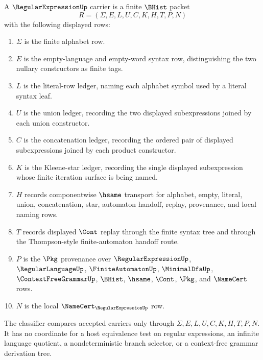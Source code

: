 \begin{definition}
\label{def:regular-expression-carrier}
A $\RegularExpressionUp$ carrier is a finite $\BHist$ packet
$$
R=(\Sigma,E,L,U,C,K,H,T,P,N)
$$
with the following displayed rows:
\begin{enumerate}
\item $\Sigma$ is the finite alphabet row.
\item $E$ is the empty-language and empty-word syntax row, distinguishing the two nullary constructors as finite tags.
\item $L$ is the literal-row ledger, naming each alphabet symbol used by a literal syntax leaf.
\item $U$ is the union ledger, recording the two displayed subexpressions joined by each union constructor.
\item $C$ is the concatenation ledger, recording the ordered pair of displayed subexpressions joined by each product constructor.
\item $K$ is the Kleene-star ledger, recording the single displayed subexpression whose finite iteration surface is being named.
\item $H$ records componentwise $\hsame$ transport for alphabet, empty, literal, union, concatenation, star, automaton handoff, replay, provenance, and local naming rows.
\item $T$ records displayed $\Cont$ replay through the finite syntax tree and through the Thompson-style finite-automaton handoff route.
\item $P$ is the $\Pkg$ provenance over $\RegularExpressionUp$, $\RegularLanguageUp$, $\FiniteAutomatonUp$, $\MinimalDfaUp$, $\ContextFreeGrammarUp$, $\BHist$, $\hsame$, $\Cont$, $\Pkg$, and $\NameCert$ rows.
\item $N$ is the local $\NameCert_{\RegularExpressionUp}$ row.
\end{enumerate}
The classifier compares accepted carriers only through $\Sigma,E,L,U,C,K,H,T,P,N$. It has no coordinate for a host equivalence test on regular expressions, an infinite language quotient, a nondeterministic branch selector, or a context-free grammar derivation tree.
\end{definition}


